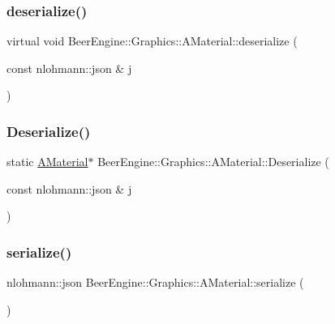 \subsubsection{\texorpdfstring{deserialize()}{deserialize()}}
{\footnotesize\ttfamily virtual void Beer\+Engine\+::\+Graphics\+::\+A\+Material\+::deserialize (\begin{DoxyParamCaption}\item[{const nlohmann\+::json \&}]{j }\end{DoxyParamCaption})\hspace{0.3cm}{\ttfamily [virtual]}}

\mbox{\label{class_beer_engine_1_1_graphics_1_1_a_material_af7b1dba516520bff75c3e71756959916}} 
\subsubsection{\texorpdfstring{Deserialize()}{Deserialize()}}
{\footnotesize\ttfamily static \mbox{\hyperlink{class_beer_engine_1_1_graphics_1_1_a_material}{A\+Material}}$\ast$ Beer\+Engine\+::\+Graphics\+::\+A\+Material\+::\+Deserialize (\begin{DoxyParamCaption}\item[{const nlohmann\+::json \&}]{j }\end{DoxyParamCaption})\hspace{0.3cm}{\ttfamily [static]}}

\mbox{\label{class_beer_engine_1_1_graphics_1_1_a_material_aaf0626af4ae3a8e004dfd3f1a23bd7c4}} 
\subsubsection{\texorpdfstring{serialize()}{serialize()}}
{\footnotesize\ttfamily nlohmann\+::json Beer\+Engine\+::\+Graphics\+::\+A\+Material\+::serialize (\begin{DoxyParamCaption}{ }\end{DoxyParamCaption})\hspace{0.3cm}{\ttfamily [virtual]}}




